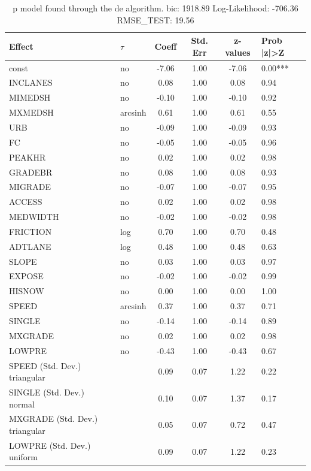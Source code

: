 \begin{table}
	\caption{p model found through the de algorithm. bic: 1918.89 Log-Likelihood: -706.36 RMSE_TEST: 19.56}
	\begin{center}
		\begin{tabular}{|l|l|c|c|c|l|}
			\hline
			Effect & $\tau$ & Coeff & Std. Err & z-values & Prob |z|>Z \\
			\hline
			const & no & -7.06 & 1.00 & -7.06 & 0.00*** \\
			\hline
			INCLANES & no & 0.08 & 1.00 & 0.08 & 0.94 \\
			\hline
			MIMEDSH & no & -0.10 & 1.00 & -0.10 & 0.92 \\
			\hline
			MXMEDSH & arcsinh & 0.61 & 1.00 & 0.61 & 0.55 \\
			\hline
			URB & no & -0.09 & 1.00 & -0.09 & 0.93 \\
			\hline
			FC & no & -0.05 & 1.00 & -0.05 & 0.96 \\
			\hline
			PEAKHR & no & 0.02 & 1.00 & 0.02 & 0.98 \\
			\hline
			GRADEBR & no & 0.08 & 1.00 & 0.08 & 0.93 \\
			\hline
			MIGRADE & no & -0.07 & 1.00 & -0.07 & 0.95 \\
			\hline
			ACCESS & no & 0.02 & 1.00 & 0.02 & 0.98 \\
			\hline
			MEDWIDTH & no & -0.02 & 1.00 & -0.02 & 0.98 \\
			\hline
			FRICTION & log & 0.70 & 1.00 & 0.70 & 0.48 \\
			\hline
			ADTLANE & log & 0.48 & 1.00 & 0.48 & 0.63 \\
			\hline
			SLOPE & no & 0.03 & 1.00 & 0.03 & 0.97 \\
			\hline
			EXPOSE & no & -0.02 & 1.00 & -0.02 & 0.99 \\
			\hline
			HISNOW & no & 0.00 & 1.00 & 0.00 & 1.00 \\
			\hline
			SPEED & arcsinh & 0.37 & 1.00 & 0.37 & 0.71 \\
			\hline
			SINGLE & no & -0.14 & 1.00 & -0.14 & 0.89 \\
			\hline
			MXGRADE & no & 0.02 & 1.00 & 0.02 & 0.98 \\
			\hline
			LOWPRE & no & -0.43 & 1.00 & -0.43 & 0.67 \\
			\hline
			SPEED (Std. Dev.) triangular &  & 0.09 & 0.07 & 1.22 & 0.22 \\
			\hline
			SINGLE (Std. Dev.) normal &  & 0.10 & 0.07 & 1.37 & 0.17 \\
			\hline
			MXGRADE (Std. Dev.) triangular &  & 0.05 & 0.07 & 0.72 & 0.47 \\
			\hline
			LOWPRE (Std. Dev.) uniform &  & 0.09 & 0.07 & 1.22 & 0.23 \\
			\hline
		\end{tabular}
	\end{center}
\end{table}